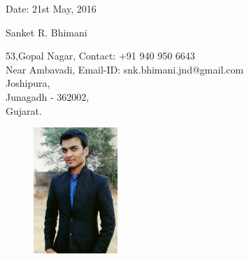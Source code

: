 \documentclass[12pt,a4paper,english]{article}
\begin{document}
	\begin{flushleft}
		Date: 21st May, 2016
	\end{flushleft}
	\begin{center}
		\huge{Sanket R. Bhimani}	
	\end{center}
	\hline
	\begin{flushleft}
		53,Gopal Nagar, \hspace{2.57in}Contact: +91 940 950 6643\\
		Near Ambavadi,	\hspace{2.57in}Email-ID: snk.bhimani.jnd@gmail.com\\
		Joshipura,\\
		Junagadh - 362002,\\
		Gujarat.
	\end{flushleft}
	\vspace{-0.6in}
	\begin{figure}[h]
		\begin{flushright}
			\includegraphics[width=120px]{sanket.jpg}
		\end{flushright}
	\end{figure}
	\hline
\end{document}
